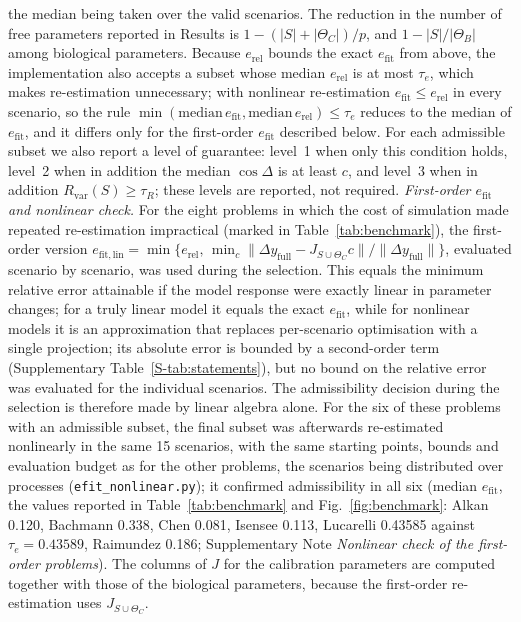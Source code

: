 \documentclass[pdflatex,sn-nature]{sn-jnl}
\theoremstyle{plain}
\begin{document}
the median being taken over the valid scenarios. The reduction in the number of free parameters reported in Results is $1-(|S|+|\Theta_C|)/p$, and $1-|S|/|\Theta_B|$ among biological parameters. Because $e_{\mathrm{rel}}$ bounds the exact $e_{\mathrm{fit}}$ from above, the implementation also accepts a subset whose median $e_{\mathrm{rel}}$ is at most $\tau_e$, which makes re-estimation unnecessary; with nonlinear re-estimation $e_{\mathrm{fit}}\le e_{\mathrm{rel}}$ in every scenario, so the rule $\min(\mathrm{median}\,e_{\mathrm{fit}},\mathrm{median}\,e_{\mathrm{rel}})\le\tau_e$ reduces to the median of $e_{\mathrm{fit}}$, and it differs only for the first-order $e_{\mathrm{fit}}$ described below. For each admissible subset we also report a level of guarantee: level~1 when only this condition holds, level~2 when in addition the median $\cos\Delta$ is at least $c$, and level~3 when in addition $R_{\mathrm{var}}(S)\ge\tau_R$; these levels are reported, not required. \label{met:adm-firstorder}\emph{First-order $e_{\mathrm{fit}}$ and nonlinear check.} For the eight problems in which the cost of simulation made repeated re-estimation impractical (marked in Table~\ref{tab:benchmark}), the first-order version $e_{\mathrm{fit,lin}}=\min\{e_{\mathrm{rel}},\,\min_c\|\Delta y_{\mathrm{full}}-J_{S\cup\Theta_C}c\|/\|\Delta y_{\mathrm{full}}\|\}$, evaluated scenario by scenario, was used during the selection. This equals the minimum relative error attainable if the model response were exactly linear in parameter changes; for a truly linear model it equals the exact $e_{\mathrm{fit}}$, while for nonlinear models it is an approximation that replaces per-scenario optimisation with a single projection; its absolute error is bounded by a second-order term (Supplementary Table~\ref{S-tab:statements}), but no bound on the relative error was evaluated for the individual scenarios. The admissibility decision during the selection is therefore made by linear algebra alone. For the six of these problems with an admissible subset, the final subset was afterwards re-estimated nonlinearly in the same 15 scenarios, with the same starting points, bounds and evaluation budget as for the other problems, the scenarios being distributed over processes (\texttt{efit\_nonlinear.py}); it confirmed admissibility in all six (median $e_{\mathrm{fit}}$, the values reported in Table~\ref{tab:benchmark} and Fig.~\ref{fig:benchmark}: Alkan 0.120, Bachmann 0.338, Chen 0.081, Isensee 0.113, Lucarelli 0.43585 against $\tau_e=0.43589$, Raimundez 0.186; Supplementary Note \textit{Nonlinear check of the first-order problems}). The columns of $J$ for the calibration parameters are computed together with those of the biological parameters, because the first-order re-estimation uses $J_{S\cup\Theta_C}$.
\end{document}
